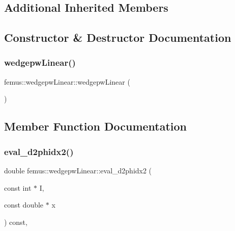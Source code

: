 \subsection*{Additional Inherited Members}


\subsection{Constructor \& Destructor Documentation}
\mbox{\label{classfemus_1_1wedgepw_linear_af42ea3177249cbcdbb1a4e61c9192a2f}} 
\subsubsection{\texorpdfstring{wedgepw\+Linear()}{wedgepwLinear()}}
{\footnotesize\ttfamily femus\+::wedgepw\+Linear\+::wedgepw\+Linear (\begin{DoxyParamCaption}{ }\end{DoxyParamCaption})\hspace{0.3cm}{\ttfamily [inline]}}



\subsection{Member Function Documentation}
\mbox{\label{classfemus_1_1wedgepw_linear_a97921882858ca490eb3bebebc333bd66}} 
\subsubsection{\texorpdfstring{eval\+\_\+d2phidx2()}{eval\_d2phidx2()}}
{\footnotesize\ttfamily double femus\+::wedgepw\+Linear\+::eval\+\_\+d2phidx2 (\begin{DoxyParamCaption}\item[{const int $\ast$}]{I,  }\item[{const double $\ast$}]{x }\end{DoxyParamCaption}) const\hspace{0.3cm}{\ttfamily [inline]}, {\ttfamily [virtual]}}



